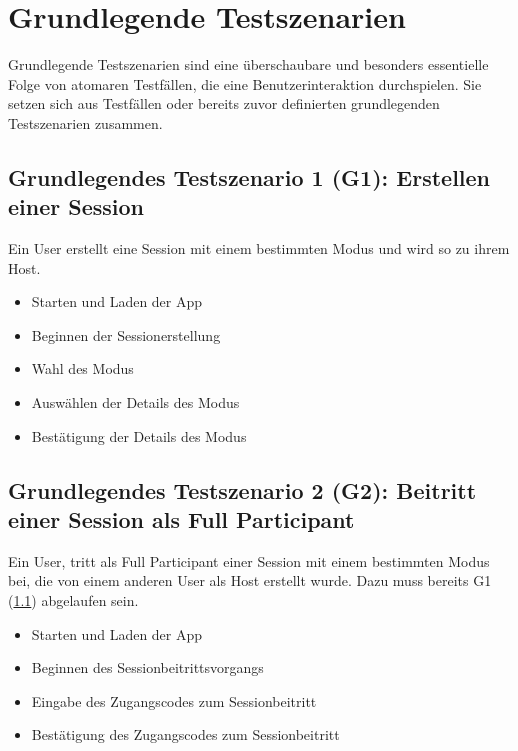 \documentclass[oneside, ngerman]{sdqtechreport}
\begin{document}
\section{Grundlegende Testszenarien}
\label{sec:Tests:GrundlegendeTestszenarien}

Grundlegende Testszenarien sind eine überschaubare und besonders essentielle Folge von atomaren Testfällen, die eine Benutzerinteraktion durchspielen. Sie setzen sich aus Testfällen oder bereits zuvor definierten grundlegenden Testszenarien zusammen.

\subsection{Grundlegendes Testszenario 1 (G1): Erstellen einer Session}
\label{subsec:Tests:GrundlegendeTestszenarien:G1}
Ein User erstellt eine Session mit einem bestimmten Modus und wird so zu ihrem Host.
\begin{itemize}
    \item Starten und Laden der App
    \item Beginnen der Sessionerstellung
    \item Wahl des Modus
    \item Auswählen der Details des Modus
    \item Bestätigung der Details des Modus
\end{itemize}


\subsection{Grundlegendes Testszenario 2 (G2): Beitritt einer Session als Full Participant}
\label{subsec:Tests:GrundlegendeTestszenarien:G2}
Ein User, tritt als Full Participant einer Session mit einem bestimmten Modus bei, die von einem anderen User als Host erstellt wurde.
Dazu muss bereits G1 (\ref{subsec:Tests:GrundlegendeTestszenarien:G1}) abgelaufen sein.
\begin{itemize}
    \item Starten und Laden der App
    \item Beginnen des Sessionbeitrittsvorgangs
    \item Eingabe des Zugangscodes zum Sessionbeitritt
    \item Bestätigung des Zugangscodes zum Sessionbeitritt
\end{itemize}
\end{document}
